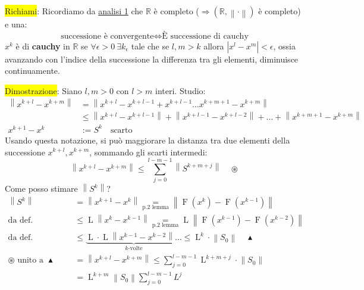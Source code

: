 \documentclass{article}
\begin{document}
\colorbox{yellow}{Richiami}:
Ricordiamo da \underline{analisi 1} che $\mathbb R$ è completo ($\Rightarrow(\mathbb R,\left\|\cdot\right\|)$ è completo) e una:
\[\text{successione è convergente}\Leftrightarrow\text{È successione di cauchy}\]
$x^k$ è di \textbf{cauchy} in $\mathbb R$ se $\forall\epsilon>0\ \exists k_\epsilon$ tale che se $l,m>k$ allora $\left|x^l-x^m\right|<\epsilon$, ossia
avanzando con l'indice della successione la differenza tra gli elementi, diminuisce continuamente.

\colorbox{yellow}{Dimostrazione}: Siano $l,m>0$ con $l>m$ interi. Studio:
\begin{align*}
    \left\|x^{k+l}-x^{k+m}\right\| & =\left\|x^{k+l}-x^{k+l-1}+x^{k+l-1}\dots x^{k+m+1}-x^{k+m}\right\|                                            \\
                                   & \le\left\|x^{k+l}-x^{k+l-1}\right\|+\left\|x^{k+l-1}-x^{k+l-2}\right\|+\dots+\left\|x^{k+m+1}-x^{k+m}\right\| \\
    x^{k+1}-x^k                    & :=S^k\quad\text{scarto}
\end{align*}
Usando questa notazione, si può maggiorare la distanza tra due elementi della successione $x^{k+l},x^{k+m}$, sommando gli scarti intermedi:
\[\boxed{\left\|x^{k+l}-x^{k+m}\right\|\le\sum_{j=0}^{l-m-1}\left\|S^{k+m+j}\right\|}\quad\circledast\]
Come posso stimare $\left\|S^k\right\|$?
\begin{align*}
    \left\|S^k\right\|                        & =\left\|x^{k+1}-x^k\right\|\underset{\text{p.2 lemma}}{=}\left\|\operatorname{F}(x^k)-\operatorname{F}(x^{k-1})\right\|                                                          \\
    \text{da def. contrazione}                & \le\operatorname{L}\left\|x^k-x^{k-1}\right\|\underset{\text{p.2 lemma}}{=}\operatorname{L}\left\|\operatorname{F}(x^{k-1})-\operatorname{F}(x^{k-2})\right\|                    \\
    \text{da def. contrazione}                & \le\underbrace{\operatorname{L}\cdot\operatorname{L}\left\|x^{k-1}-x^{k-2}\right\|\dots}_{k\text{-volte}}\le\boxed{\operatorname{L}^k\cdot\left\|S_0\right\|}\quad\blacktriangle \\
    \circledast\text{ unito a }\blacktriangle & =\left\|x^{k+l}-x^{k+m}\right\|\le\sum_{j=0}^{l-m-1}\operatorname{L}^{k+m+j}\cdot\left\|S_0\right\|                                                                              \\
                                              & =\operatorname{L}^{k+m}\left\|S_0\right\|\sum_{j=0}^{l-m-1}L^j
\end{align*}
\end{document}
